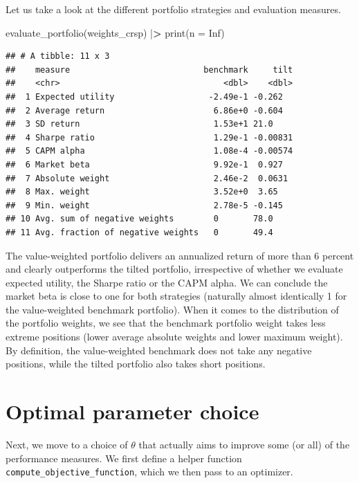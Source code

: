 \documentclass[
]{book}
\newenvironment{Shaded}{\begin{snugshade}}{\end{snugshade}}
\newcommand{\AttributeTok}[1]{\textcolor[rgb]{0.61,0.61,0.61}{#1}}
\newcommand{\ConstantTok}[1]{\textcolor[rgb]{0,0,0}{#1}}
\newcommand{\ErrorTok}[1]{\textcolor[rgb]{0.14,0.14,0.14}{\textbf{#1}}}
\newcommand{\FunctionTok}[1]{\textcolor[rgb]{0,0,0}{#1}}
\newcommand{\NormalTok}[1]{#1}
\newcommand{\SpecialCharTok}[1]{\textcolor[rgb]{0,0,0}{#1}}
\begin{document}
Let us take a look at the different portfolio strategies and evaluation measures.

\begin{Shaded}
\begin{Highlighting}[]
\FunctionTok{evaluate\_portfolio}\NormalTok{(weights\_crsp) }\SpecialCharTok{|}\ErrorTok{\textgreater{}} 
  \FunctionTok{print}\NormalTok{(}\AttributeTok{n =} \ConstantTok{Inf}\NormalTok{)}
\end{Highlighting}
\end{Shaded}

\begin{verbatim}
## # A tibble: 11 x 3
##    measure                           benchmark     tilt
##    <chr>                                 <dbl>    <dbl>
##  1 Expected utility                   -2.49e-1 -0.262  
##  2 Average return                      6.86e+0 -0.604  
##  3 SD return                           1.53e+1 21.0    
##  4 Sharpe ratio                        1.29e-1 -0.00831
##  5 CAPM alpha                          1.08e-4 -0.00574
##  6 Market beta                         9.92e-1  0.927  
##  7 Absolute weight                     2.46e-2  0.0631 
##  8 Max. weight                         3.52e+0  3.65   
##  9 Min. weight                         2.78e-5 -0.145  
## 10 Avg. sum of negative weights        0       78.0    
## 11 Avg. fraction of negative weights   0       49.4
\end{verbatim}

The value-weighted portfolio delivers an annualized return of more than 6 percent and clearly outperforms the tilted portfolio, irrespective of whether we evaluate expected utility, the Sharpe ratio or the CAPM alpha. We can conclude the market beta is close to one for both strategies (naturally almost identically 1 for the value-weighted benchmark portfolio). When it comes to the distribution of the portfolio weights, we see that the benchmark portfolio weight takes less extreme positions (lower average absolute weights and lower maximum weight). By definition, the value-weighted benchmark does not take any negative positions, while the tilted portfolio also takes short positions.

\hypertarget{optimal-parameter-choice}{%
\section{Optimal parameter choice}\label{optimal-parameter-choice}}

Next, we move to a choice of \(\theta\) that actually aims to improve some (or all) of the performance measures. We first define a helper function \texttt{compute\_objective\_function}, which we then pass to an optimizer.
\end{document}
